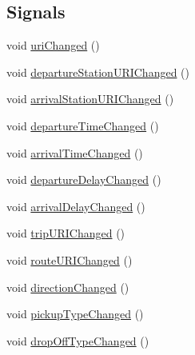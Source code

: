 \subsection*{Signals}
\begin{DoxyCompactItemize}
\item 
void \mbox{\hyperlink{classQRail_1_1Fragments_1_1Fragment_aef96a29b0a9babac79b1705be6d89346}{uri\+Changed}} ()
\item 
void \mbox{\hyperlink{classQRail_1_1Fragments_1_1Fragment_abcc2d491d8bf185a8decd5d2d50184c5}{departure\+Station\+U\+R\+I\+Changed}} ()
\item 
void \mbox{\hyperlink{classQRail_1_1Fragments_1_1Fragment_a9abe8cefcf98074dad6ab05cd9e1176e}{arrival\+Station\+U\+R\+I\+Changed}} ()
\item 
void \mbox{\hyperlink{classQRail_1_1Fragments_1_1Fragment_ab5c245bd5692e160706ca7af5bac9b95}{departure\+Time\+Changed}} ()
\item 
void \mbox{\hyperlink{classQRail_1_1Fragments_1_1Fragment_a25c138e7c2939c86cd0a807ad16bbf14}{arrival\+Time\+Changed}} ()
\item 
void \mbox{\hyperlink{classQRail_1_1Fragments_1_1Fragment_af0f3fbd899889332e07a8164d42aa03d}{departure\+Delay\+Changed}} ()
\item 
void \mbox{\hyperlink{classQRail_1_1Fragments_1_1Fragment_aab695e85463576d8ff4a34abede25349}{arrival\+Delay\+Changed}} ()
\item 
void \mbox{\hyperlink{classQRail_1_1Fragments_1_1Fragment_aceacbf6c28c95fccbc2eebef403cc90a}{trip\+U\+R\+I\+Changed}} ()
\item 
void \mbox{\hyperlink{classQRail_1_1Fragments_1_1Fragment_a8613cde7c85d75a7ecec52a4ae772c5b}{route\+U\+R\+I\+Changed}} ()
\item 
void \mbox{\hyperlink{classQRail_1_1Fragments_1_1Fragment_a011ffdebc6a0b21813e176b178bd98c1}{direction\+Changed}} ()
\item 
void \mbox{\hyperlink{classQRail_1_1Fragments_1_1Fragment_a044fde06eb85c7b6e0167dfa5b7e66b9}{pickup\+Type\+Changed}} ()
\item 
void \mbox{\hyperlink{classQRail_1_1Fragments_1_1Fragment_a6bb695afb3ad12cb9b1f15e8bdf52a29}{drop\+Off\+Type\+Changed}} ()
\end{DoxyCompactItemize}

